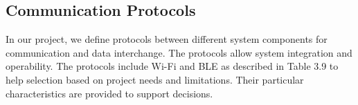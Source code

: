\documentclass[a4paper,12pt]{report}
\begin{document}

\subsection{Communication Protocols}
In our project, we define protocols between different system components for communication and data interchange. The protocols allow system integration and operability. The protocols include Wi-Fi and BLE as described in Table 3.9 to help selection based on project needs and limitations. Their particular characteristics are provided to support decisions.

\clearpage
\renewcommand{\arraystretch}{1.8} %
\end{document}
